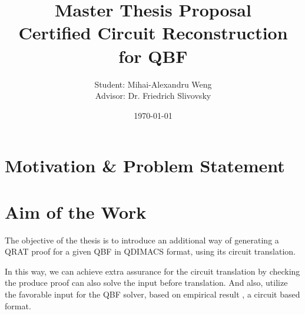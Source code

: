 \documentclass[12pt, a4paper]{article}
\title{
    \textbf{Master Thesis Proposal}\\
    Certified Circuit Reconstruction for QBF
}
\author{Student: Mihai-Alexandru Weng \\ Advisor: Dr. Friedrich Slivovsky}
\date{\today}
\begin{document}
\maketitle
\tableofcontents
\newpage

\section{Motivation \& Problem Statement}






\newpage

\section{Aim of the Work}

The objective of the thesis is to introduce an additional way of generating a QRAT proof for a given QBF in QDIMACS format, using its circuit translation.

In this way, we can achieve extra assurance for the circuit translation by checking the produce proof can also solve the input before translation. And also, utilize the favorable input for the QBF solver, based on empirical result \cite{jordan_non-cnf_nodate}, a circuit based format.

\newpage
\end{document}
